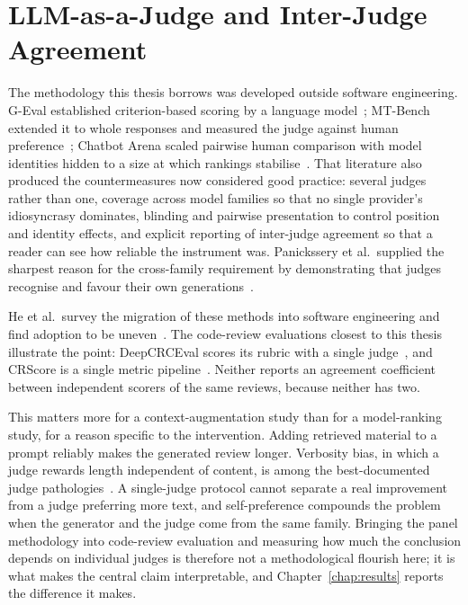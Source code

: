 \section{LLM-as-a-Judge and Inter-Judge Agreement}
\label{sec:sota-judge}

The methodology this thesis borrows was developed outside software engineering.
G-Eval established criterion-based scoring by a language
model~\cite{liu2023geval}; MT-Bench extended it to whole responses and measured the
judge against human preference~\cite{zheng2023judging}; Chatbot Arena scaled
pairwise human comparison with model identities hidden to a size at which
rankings stabilise~\cite{chiang2024chatbotarena}. That literature also produced the
countermeasures now considered good practice: several judges rather than one,
coverage across model families so that no single provider's idiosyncrasy dominates,
blinding and pairwise presentation to control position and identity effects, and
explicit reporting of inter-judge agreement so that a reader can see how reliable
the instrument was. Panickssery et al.\ supplied the sharpest reason for the
cross-family requirement by demonstrating that judges recognise and favour their
own generations~\cite{panickssery2024selfpreference}.

He et al.\ survey the migration of these methods into software engineering and find
adoption to be uneven~\cite{he2025llmasjudgese}. The code-review evaluations closest
to this thesis illustrate the point: DeepCRCEval scores its rubric with a single
judge~\cite{hong2024deepcrceval}, and CRScore is a single metric
pipeline~\cite{naik2025crscore}. Neither reports an agreement coefficient between
independent scorers of the same reviews, because neither has two.

This matters more for a context-augmentation study than for a model-ranking study,
for a reason specific to the intervention. Adding retrieved material to a prompt
reliably makes the generated review longer. Verbosity bias, in which a judge
rewards length independent of content, is among the best-documented judge
pathologies~\cite{zheng2023judging}. A single-judge protocol cannot separate a real
improvement from a judge preferring more text, and self-preference compounds the
problem when the generator and the judge come from the same family. Bringing the
panel methodology into code-review evaluation and measuring how much the
conclusion depends on individual judges is therefore
not a methodological flourish here; it is what makes the central claim
interpretable, and Chapter~\ref{chap:results} reports the difference it makes.
